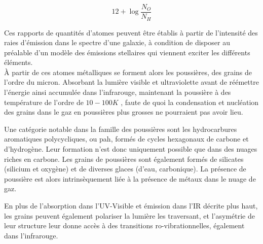 \documentclass[12pt, a4paper]{article}
\begin{document}
\begin{equation}
  \label{eq:abundance}
  12 + \log{\frac{N_O}{N_H}}
\end{equation}

Ces rapports de quantités d'atomes peuvent être établis à partir de l'intensité des raies d'émission dans le spectre d'une galaxie, à condition de disposer au préalable d'un modèle des émissions stellaires qui viennent exciter les différents éléments.\\

À partir de ces atomes métalliques se forment alors les poussières, des grains de l'ordre du micron. Absorbant la lumière visible et ultraviolette avant de réémettre l'énergie ainsi accumulée dans l'infrarouge, maintenant la poussière à des température de l'ordre de $10 - 100K$ \parencite{Astrophysics-of-the-Diffuse-Universe}, faute de quoi la condensation et nucléation des grains dans le gaz en poussières plus grosses ne pourraient pas avoir lieu.

Une catégorie notable dans la famille des poussières sont les hydrocarbures aromatiques polycycliques, ou \gls{pah}, formés de cycles hexagonaux de carbone et d'hydrogène. Leur formation n'est donc uniquement possible que dans des nuages riches en carbone. Les grains de poussières sont également formés de silicates (silicium et oxygène) et de diverses glaces (d'eau, carbonique). La présence de poussière est alors intrinsèquement liée à la présence de métaux dans le nuage de gaz.

En plus de l'absorption dans l'UV-Visible et émission dans l'IR décrite plus haut, les grains peuvent également polariser la lumière les traversant, et l'asymétrie de leur structure leur donne accès à des transitions ro-vibrationnelles, également dans l'infrarouge.\\
\end{document}
